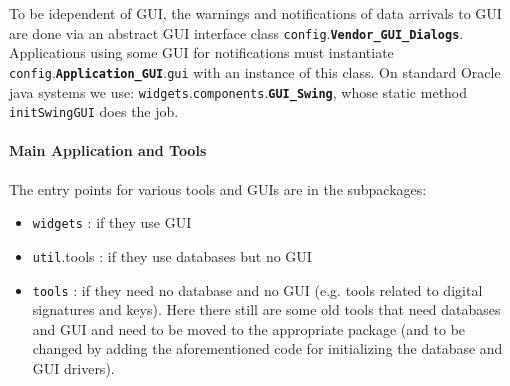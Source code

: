 \documentclass{book}
\newcommand{\pkg}[1]{{\tt #1}}
\newcommand{\cls}[1]{{\tt\bf #1}}
\newcommand{\mth}[1]{{\tt #1}}
\newcommand{\mmb}[1]{{\tt #1}}
\begin{document}
To be idependent of GUI, the warnings and notifications of data arrivals to GUI are done via an abstract GUI interface class
\pkg{config}.\cls{Vendor\_GUI\_Dialogs}. Applications using some GUI for notifications must instantiate
\pkg{config}.\cls{Application\_GUI}.\mmb{gui} with an instance of this class.  On standard Oracle java systems we use: 
\pkg{widgets}.\pkg{components}.\cls{GUI\_Swing}, whose static method \mth{initSwingGUI} does the job.

\paragraph{Main Application and Tools}
The entry points for various tools and GUIs are in the subpackages:
\begin{itemize}
\item
 \pkg{widgets} : if they use GUI
\item
 \pkg{util}.{tools} : if they use databases but no GUI
\item
 \pkg{tools} : if they need no database and no GUI (e.g. tools related to digital signatures and keys). Here there still are some old tools
 that need databases and GUI and need to be moved to the appropriate package (and to be changed by adding the aforementioned code for initializing the database and GUI drivers).
\end{itemize}
\end{document}
